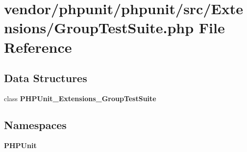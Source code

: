 \section{vendor/phpunit/phpunit/src/\+Extensions/\+Group\+Test\+Suite.php File Reference}
\label{_group_test_suite_8php}
\subsection*{Data Structures}
\begin{DoxyCompactItemize}
\item 
class {\bf P\+H\+P\+Unit\+\_\+\+Extensions\+\_\+\+Group\+Test\+Suite}
\end{DoxyCompactItemize}
\subsection*{Namespaces}
\begin{DoxyCompactItemize}
\item 
 {\bf P\+H\+P\+Unit}
\end{DoxyCompactItemize}
